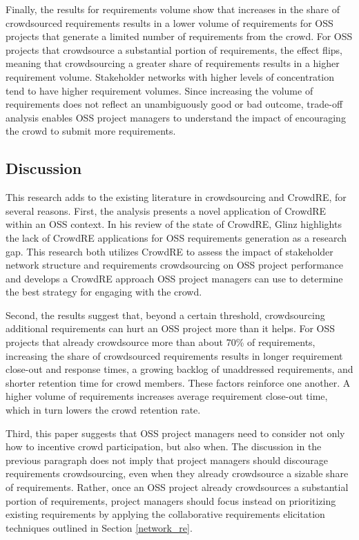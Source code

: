 Finally, the results for requirements volume show that increases in the share of crowdsourced requirements results in a lower volume of requirements for OSS projects that generate a limited number of requirements from the crowd. For OSS projects that crowdsource a substantial portion of requirements, the effect flips, meaning that crowdsourcing a greater share of requirements results in a higher requirement volume. Stakeholder networks with higher levels of concentration tend to have higher requirement volumes. Since increasing the volume of requirements does not reflect an unambiguously good or bad outcome, trade-off analysis enables OSS project managers to understand the impact of encouraging the crowd to submit more requirements.

\subsection{Discussion}

This research adds to the existing literature in crowdsourcing and CrowdRE, for several reasons. First, the analysis presents a novel application of CrowdRE within an OSS context. In his review of the state of CrowdRE, Glinz \cite{glinz} highlights the lack of CrowdRE applications for OSS requirements generation as a research gap. This research both utilizes CrowdRE to assess the impact of stakeholder network structure and requirements crowdsourcing on OSS project performance and develops a CrowdRE approach OSS project managers can use to determine the best strategy for engaging with the crowd.

Second, the results suggest that, beyond a certain threshold, crowdsourcing additional requirements can hurt an OSS project more than it helps. For OSS projects that already crowdsource more than about 70\% of requirements, increasing the share of crowdsourced requirements results in longer requirement close-out and response times, a growing backlog of unaddressed requirements, and shorter retention time for crowd members. These factors reinforce one another. A higher volume of requirements increases average requirement close-out time, which in turn lowers the crowd retention rate.

Third, this paper suggests that OSS project managers need to consider not only how to incentive crowd participation, but also when. The discussion in the previous paragraph does not imply that project managers should discourage requirements crowdsourcing, even when they already crowdsource a sizable share of requirements. Rather, once an OSS project already crowdsources a substantial portion of requirements, project managers should focus instead on prioritizing existing requirements by applying the collaborative requirements elicitation techniques outlined in Section \ref{network_re}.

